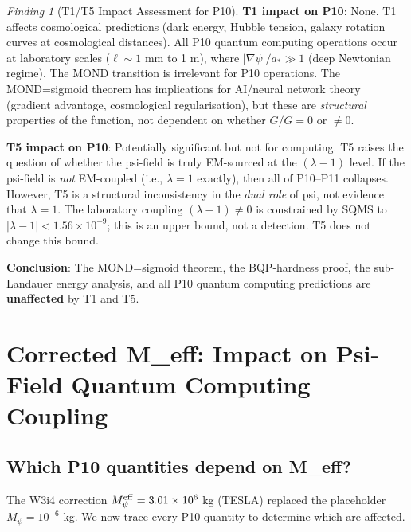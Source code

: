 \documentclass[11pt]{article}
\theoremstyle{definition}
\theoremstyle{remark}
\newtheorem{finding}[theorem]{Finding}
\newcommand{\astar}{a_*}
\newcommand{\lam}{\lambda}
\newcommand{\Mpsi}{M_\psi}
\newcommand{\Meff}{M_\psi^{\rm eff}}
\newcommand{\ee}[1]{\times 10^{#1}}
\begin{document}
\begin{finding}[T1/T5 Impact Assessment for P10]
\label{find:t1t5_p10}
\textbf{T1 impact on P10}: None. T1 affects cosmological predictions
(dark energy, Hubble tension, galaxy rotation curves at cosmological
distances). All P10 quantum computing operations occur at laboratory
scales ($\ell \sim 1$ mm to 1 m), where $|\nabla\psi|/\astar \gg 1$
(deep Newtonian regime). The MOND transition is irrelevant for P10
operations. The MOND=sigmoid theorem has implications for AI/neural
network theory (gradient advantage, cosmological regularisation), but
these are \emph{structural} properties of the function, not dependent on
whether $\dot{G}/G = 0$ or $\neq 0$.

\textbf{T5 impact on P10}: Potentially significant but not for computing.
T5 raises the question of whether the psi-field is truly EM-sourced at
the $(\lam-1)$ level. If the psi-field is \emph{not} EM-coupled (i.e.,
$\lam = 1$ exactly), then all of P10--P11 collapses. However, T5 is a
structural inconsistency in the \emph{dual role} of psi, not evidence
that $\lam = 1$. The laboratory coupling $(\lam-1) \neq 0$ is
constrained by SQMS to $|\lam-1| < 1.56\ee{-9}$; this is an upper
bound, not a detection. T5 does not change this bound.

\textbf{Conclusion}: The MOND=sigmoid theorem, the BQP-hardness proof,
the sub-Landauer energy analysis, and all P10 quantum computing
predictions are \textbf{unaffected} by T1 and T5.
\end{finding}

\section{Corrected M\_eff: Impact on Psi-Field Quantum Computing Coupling}
\label{sec:meff_p10}

\subsection{Which P10 quantities depend on M\_eff?}

The W3i4 correction $\Meff = 3.01\ee{6}$ kg (TESLA) replaced the
placeholder $\Mpsi = 10^{-6}$ kg. We now trace every P10 quantity to
determine which are affected.
\end{document}
